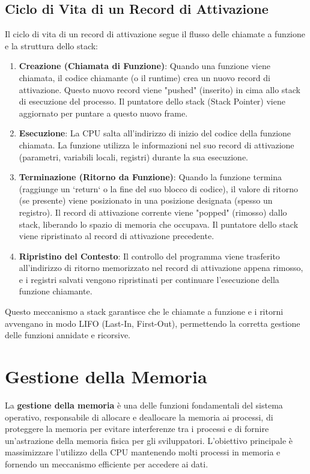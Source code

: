\subsection{Ciclo di Vita di un Record di Attivazione}
Il ciclo di vita di un record di attivazione segue il flusso delle chiamate a funzione e la struttura dello stack:
\begin{enumerate}
    \item \textbf{Creazione (Chiamata di Funzione)}: Quando una funzione viene chiamata, il codice chiamante (o il runtime) crea un nuovo record di attivazione. Questo nuovo record viene "pushed" (inserito) in cima allo stack di esecuzione del processo. Il puntatore dello stack (Stack Pointer) viene aggiornato per puntare a questo nuovo frame.
    \item \textbf{Esecuzione}: La CPU salta all'indirizzo di inizio del codice della funzione chiamata. La funzione utilizza le informazioni nel suo record di attivazione (parametri, variabili locali, registri) durante la sua esecuzione.
    \item \textbf{Terminazione (Ritorno da Funzione)}: Quando la funzione termina (raggiunge un `return` o la fine del suo blocco di codice), il valore di ritorno (se presente) viene posizionato in una posizione designata (spesso un registro). Il record di attivazione corrente viene "popped" (rimosso) dallo stack, liberando lo spazio di memoria che occupava. Il puntatore dello stack viene ripristinato al record di attivazione precedente.
    \item \textbf{Ripristino del Contesto}: Il controllo del programma viene trasferito all'indirizzo di ritorno memorizzato nel record di attivazione appena rimosso, e i registri salvati vengono ripristinati per continuare l'esecuzione della funzione chiamante.
\end{enumerate}
Questo meccanismo a stack garantisce che le chiamate a funzione e i ritorni avvengano in modo LIFO (Last-In, First-Out), permettendo la corretta gestione delle funzioni annidate e ricorsive.

\section{Gestione della Memoria}
La \textbf{gestione della memoria} è una delle funzioni fondamentali del sistema operativo, responsabile di allocare e deallocare la memoria ai processi, di proteggere la memoria per evitare interferenze tra i processi e di fornire un'astrazione della memoria fisica per gli sviluppatori. L'obiettivo principale è massimizzare l'utilizzo della CPU mantenendo molti processi in memoria e fornendo un meccanismo efficiente per accedere ai dati.

